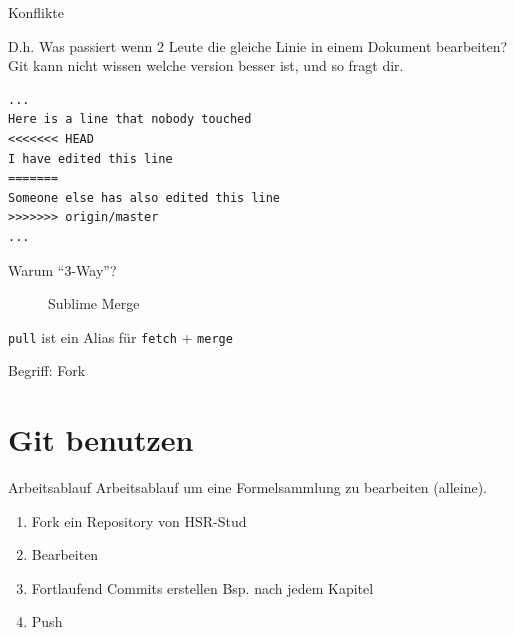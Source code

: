 \begin{frame}[fragile]{Konflikte}
	\begin{block}{}
	D.h. Was passiert wenn 2 Leute die gleiche Linie in einem Dokument bearbeiten?
	\\
	\pause
	\vspace{1em}
	Git kann nicht wissen welche version besser ist, und so fragt dir.
	\end{block}
	\begin{verbatim}
...
Here is a line that nobody touched
<<<<<<< HEAD
I have edited this line
=======
Someone else has also edited this line
>>>>>>> origin/master
...\end{verbatim}
\end{frame}
\begin{frame}{Warum ``3-Way''?}
	\begin{center}
	\begin{figure}
	\caption{Sublime Merge}
	\end{figure}
	\end{center}

	\pause
	\begin{center}
	\Large
	\texttt{pull} ist ein Alias f\"ur \texttt{fetch} + \texttt{merge}
	\end{center}
\end{frame}

\begin{frame}{Begriff: Fork}
\end{frame}

\section{Git benutzen}



\begin{frame}{Arbeitsablauf}
	Arbeitsablauf um eine Formelsammlung zu bearbeiten (alleine).
	\begin{enumerate}
		\item Fork ein Repository von HSR-Stud \pause
		\item Bearbeiten \pause
		\item Fortlaufend Commits erstellen Bsp. nach jedem Kapitel \pause
		\item Push
	\end{enumerate}
\end{frame}

